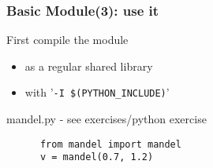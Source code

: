 \begin{frame}[fragile]
  \frametitle{Basic Module(3): use it}
  \begin{block}{First compile the module}
    \begin{itemize}
    \item as a regular shared library
    \item with '\texttt{-I \$(PYTHON\_INCLUDE)}'
    \end{itemize}
  \end{block}
  \begin{block}{mandel.py - see exercises/python exercise}
    \begin{verbatim}
      from mandel import mandel
      v = mandel(0.7, 1.2)
    \end{verbatim}
  \end{block}
\end{frame}
